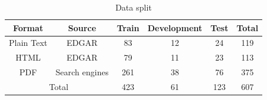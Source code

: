 \begin{table}[t]
    \centering
    \fontsize{8pt}{10pt}\selectfont
    \setlength{\tabcolsep}{4pt}
    \renewcommand{\arraystretch}{.6}
    \begin{tabular}{cccccc}\toprule
        Format & Source & Train & Development & Test & Total \\\midrule
        Plain Text & EDGAR & 83 & 12 & 24 & 119 \\
        HTML & EDGAR & 79 & 11 & 23 & 113\\
        PDF & Search engines & 261 & 38 & 76 & 375 \\\midrule
        \multicolumn{2}{c}{Total} & 423 & 61 & 123 & 607\\\bottomrule
    \end{tabular}
    \caption{Data split}\label{tab:data-split}
\end{table}
